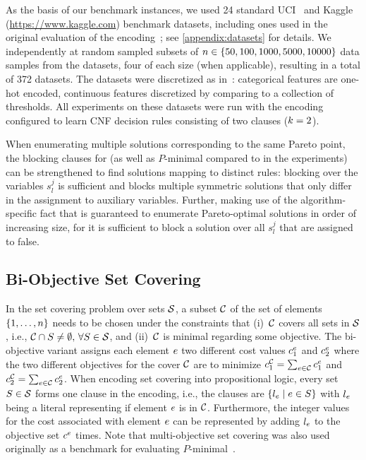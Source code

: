 As the basis of our benchmark instances, we used 24 standard UCI~\autocite{UciMlr} and Kaggle ({\small\url{https://www.kaggle.com}}) benchmark datasets, including ones used in the original evaluation of the encoding~\autocite{DBLP:conf/cp/MaliotovM18}; see \cref{appendix:datasets} for details.
We independently at random sampled subsets of $n\in\{50,100,1000,5000,10000\}$ data samples from the datasets, four of each size (when applicable), resulting in a total of 372 datasets.
The datasets were discretized as in~\autocite{DBLP:conf/cp/MaliotovM18}:
categorical features are one-hot encoded, continuous features discretized by comparing to a collection of thresholds.
All experiments on these datasets were run with the encoding configured to learn CNF decision rules consisting of two clauses ($k = 2$).

When enumerating multiple solutions corresponding to the same Pareto point, the blocking clauses for \algname{} (as well as $P$-minimal compared to in the experiments) can be strengthened to find solutions mapping to distinct rules:
blocking over the variables $s_l^j$ is sufficient and blocks multiple symmetric solutions that only differ in the assignment to auxiliary variables.
Further, making use of the algorithm-specific fact that \algname{} is guaranteed to enumerate Pareto-optimal solutions in order of increasing size, for \algname{} it is sufficient to block a solution over all $s_l^j$ that are assigned to false.

\subsection{Bi-Objective Set Covering}

In the set covering problem over sets $\mathcal{S}$, a subset $\mathcal{C}$ of the set of elements $\{1,\dots,n\}$ needs to be chosen under the constraints that (i)~$\mathcal{C}$ covers all sets in $\mathcal{S}$, i.e., $\mathcal{C}\cap S\neq\emptyset,\,\forall S\in\mathcal{S}$, and (ii)~$\mathcal{C}$ is minimal regarding some objective.
The bi-objective variant assigns each element $e$ two different cost values $c^e_1$ and $c^e_2$ where the two different objectives for the cover $\mathcal{C}$ are to minimize $c^{\mathcal{C}}_1 = \sum_{e\in\mathcal{C}}c^e_1$ and $c^{\mathcal{C}}_2 = \sum_{e\in\mathcal{C}}c^e_2$.
When encoding set covering into propositional logic, every set $S\in\mathcal{S}$ forms one clause in the encoding, i.e., the clauses are $\{l_e \mid e\in S\}$ with $l_e$ being a literal representing if element $e$ is in $\mathcal{C}$.
Furthermore, the integer values for the cost associated with element $e$ can be represented by adding $l_e$ to the objective set $c^e$ times.
Note that multi-objective set covering was also used originally as a benchmark for evaluating $P$-minimal~\autocite{DBLP:conf/cp/SohBTB17}.

